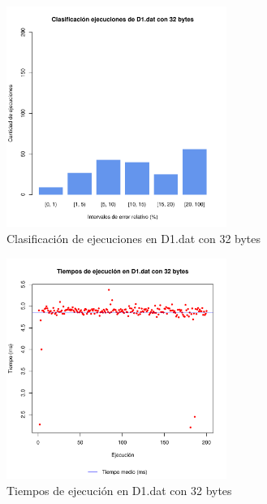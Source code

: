 \begin{figure}[h!]
    \centering
        \includegraphics[width=0.64\textwidth]{../figs/D1/plot_count_32.pdf}
        \caption{Clasificación de ejecuciones en D1.dat con 32 bytes}
    \label{figura:D1_count_32}
\end{figure}

\begin{figure}[h!]
    \centering
        \includegraphics[width=0.64\textwidth]{../figs/D1/plot_time_32.pdf}
        \caption{Tiempos de ejecución en D1.dat con 32 bytes}
    \label{figura:D1_time_32}
\end{figure}

\clearpage
